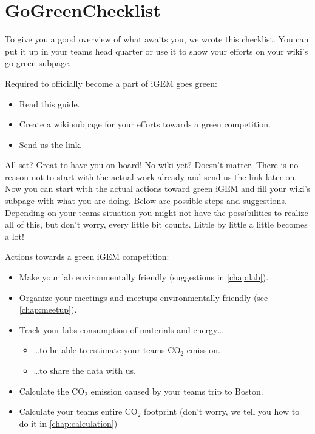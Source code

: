 \section{GoGreenChecklist}\label{checklist}
To give you a good overview of what awaits you, we wrote this checklist. You can put it up in your teams head quarter or use it to show your efforts on your wiki's go green subpage.
\bigskip
{\renewcommand{\labelitemi}{\tickleaf}
\begin{checklistbox}
{\sffamily\textcolor{ocre}{Required to officially become a part of iGEM goes green:}}
\begin{itemize}
	\item[\tickleafticked] Read this guide.
	\item Create a wiki subpage for your efforts towards a green competition.%
	\item Send us the link.
\end{itemize}
\end{checklistbox}
\bigskip
All set? Great to have you on board! No wiki yet? Doesn't matter. There is no reason not to start with the actual work already and send us the link later on. Now you can start with the actual actions toward green iGEM and fill your wiki's subpage with what you are doing. Below are possible steps and suggestions. Depending on your teams situation you might not have the possibilities to realize all of this, but don't worry, every little bit counts. Little by little a little becomes a lot!
\bigskip
\begin{checklistbox}
{\sffamily\textcolor{ocre}{Actions towards a green iGEM competition:}}
\begin{itemize}
	\item Make your lab environmentally friendly (suggestions in \cref{chap:lab}).
	\item Organize your meetings and meetups environmentally friendly (see \cref{chap:meetup}).
	\item Track your labs consumption of materials and energy\dots
	\begin{itemize}
		\item[] \dots to be able to estimate your teams CO$_2$ emission.
		\item[] \dots to share the data with us.
	\end{itemize}
	\item Calculate the CO$_2$ emission caused by your teams trip to Boston.
	\item Calculate your teams entire CO$_2$ footprint (don't worry, we tell you how to do it in \cref{chap:calculation})

\end{itemize}
\end{checklistbox}}
